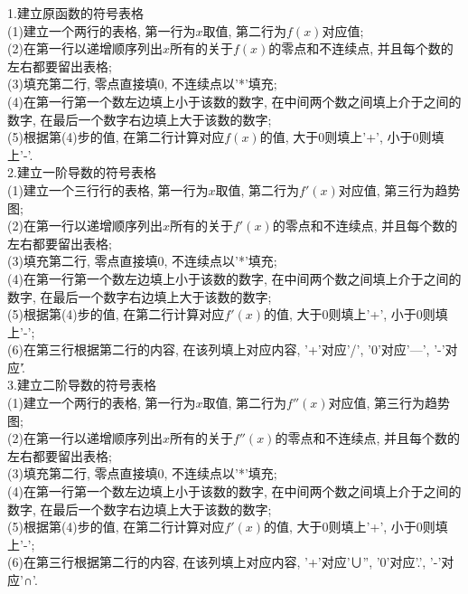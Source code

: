 \documentclass[UTF8, fontset=ubuntu]{ctexart}
\begin{document}
1.建立原函数的符号表格\\
(1)建立一个两行的表格, 第一行为$x$取值, 第二行为$f(x)$对应值;\\
(2)在第一行以递增顺序列出$x$所有的关于$f(x)$的零点和不连续点, 并且每个数的左右都要留出表格;\\
(3)填充第二行, 零点直接填0, 不连续点以'*'填充;\\
(4)在第一行第一个数左边填上小于该数的数字, 在中间两个数之间填上介于之间的数字, 在最后一个数字右边填上大于该数的数字;\\
(5)根据第(4)步的值, 在第二行计算对应$f(x)$的值, 大于0则填上'+', 小于0则填上'-'.\\[2ex]

2.建立一阶导数的符号表格\\
(1)建立一个三行行的表格, 第一行为$x$取值, 第二行为$f'(x)$对应值, 第三行为趋势图;\\
(2)在第一行以递增顺序列出$x$所有的关于$f'(x)$的零点和不连续点, 并且每个数的左右都要留出表格;\\
(3)填充第二行, 零点直接填0, 不连续点以'*'填充;\\
(4)在第一行第一个数左边填上小于该数的数字, 在中间两个数之间填上介于之间的数字, 在最后一个数字右边填上大于该数的数字;\\
(5)根据第(4)步的值, 在第二行计算对应$f'(x)$的值, 大于0则填上'+', 小于0则填上'-';\\
(6)在第三行根据第二行的内容, 在该列填上对应内容, '+'对应'/', '0'对应'—', '-'对应'\'.\\[2ex]

3.建立二阶导数的符号表格\\
(1)建立一个两行的表格, 第一行为$x$取值, 第二行为$f''(x)$对应值, 第三行为趋势图;\\
(2)在第一行以递增顺序列出$x$所有的关于$f''(x)$的零点和不连续点, 并且每个数的左右都要留出表格;\\
(3)填充第二行, 零点直接填0, 不连续点以'*'填充;\\
(4)在第一行第一个数左边填上小于该数的数字, 在中间两个数之间填上介于之间的数字, 在最后一个数字右边填上大于该数的数字;\\
(5)根据第(4)步的值, 在第二行计算对应$f'(x)$的值, 大于0则填上'+', 小于0则填上'-';\\
(6)在第三行根据第二行的内容, 在该列填上对应内容, '+'对应'∪'', '0'对应'.', '-'对应'∩'.\\[2ex]
\end{document}

